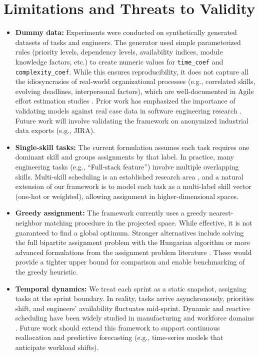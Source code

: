 \documentclass[journal]{IEEEtran}
\begin{document}
\section{Limitations and Threats to Validity}\label{sec:limits}
\begin{itemize}[leftmargin=*]
    \item \textbf{Dummy data:} Experiments were conducted on synthetically generated datasets of tasks and engineers. 
    The generator used simple parameterized rules (priority levels, dependency levels, availability indices, module knowledge factors, etc.) to create numeric values for \texttt{time\_coef} and \texttt{complexity\_coef}. 
    While this ensures reproducibility, it does not capture all the idiosyncrasies of real-world organizational processes (e.g., correlated skills, evolving deadlines, interpersonal factors), which are well-documented in Agile effort estimation studies \cite{misirli2013agileuncertainty}.
    Prior work has emphasized the importance of validating models against real case data in software engineering research \cite{RunesonHost2009}. 
    Future work will involve validating the framework on anonymized industrial data exports (e.g., JIRA). 
    
    \item \textbf{Single-skill tasks:} The current formulation assumes each task requires one dominant skill and groups assignments by that label. 
    In practice, many engineering tasks (e.g., “Full-stack feature”) involve multiple overlapping skills. 
    Multi-skill scheduling is an established research area \cite{WileyMSPSPReview2018,WorldSciMSRCPSP2019}, and a natural extension of our framework is to model each task as a multi-label skill vector (one-hot or weighted), allowing assignment in higher-dimensional spaces. 
    
    \item \textbf{Greedy assignment:} The framework currently uses a greedy nearest-neighbor matching procedure in the projected space. 
    While effective, it is not guaranteed to find a global optimum. 
    Stronger alternatives include solving the full bipartite assignment problem with the Hungarian algorithm \cite{kuhn1955hungarian} or more advanced formulations from the assignment problem literature \cite{BurkardAssignmentBook}. 
    These would provide a tighter upper bound for comparison and enable benchmarking of the greedy heuristic. 
    
    \item \textbf{Temporal dynamics:} We treat each sprint as a static snapshot, assigning tasks at the sprint boundary. 
    In reality, tasks arrive asynchronously, priorities shift, and engineers’ availability fluctuates mid-sprint. 
    Dynamic and reactive scheduling have been widely studied in manufacturing and workforce domains \cite{ReactiveSchedSurvey2006,RealTimeSchedSurvey2014,RollingHorizonSurvey2010}. 
    Future work should extend this framework to support continuous reallocation and predictive forecasting (e.g., time-series models that anticipate workload shifts).
\end{itemize}
\end{document}

